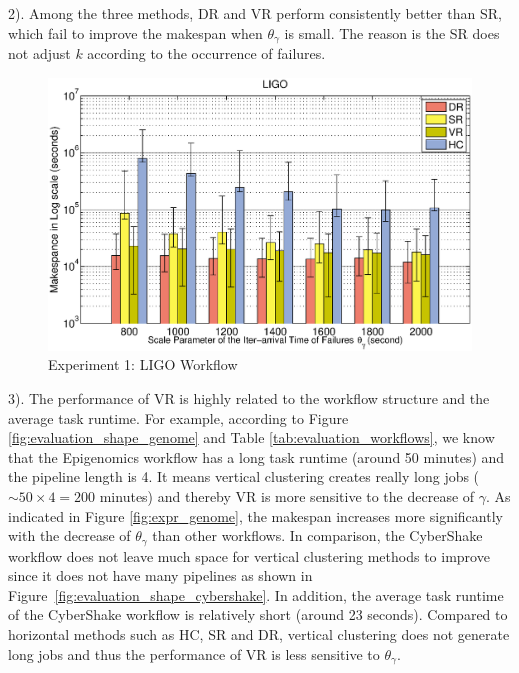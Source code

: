 2). Among the three methods, DR and VR perform consistently better than SR, which fail to improve the makespan when $\theta_{\gamma}$ is small. The reason is the SR does not adjust $k$ according to the occurrence of failures. 

\begin{figure}[!htb]
\centering
  \includegraphics[width=1\linewidth]{figures/tolerance/ligo.eps}
  \caption{Experiment 1: LIGO Workflow}
  \label{fig:expr_ligo}
\end{figure}

3). The performance of VR is highly related to the workflow structure and the average task runtime. For example, according to Figure \ref{fig:evaluation_shape_genome} and Table \ref{tab:evaluation_workflows}, we know that the Epigenomics workflow has a long task runtime (around 50 minutes) and the pipeline length is 4. It means vertical clustering creates really long jobs ($\sim 50\times 4=200$ minutes) and thereby VR is more sensitive to the decrease of $\gamma$. As indicated in Figure \ref{fig:expr_genome}, the makespan increases more significantly with the decrease of $\theta_{\gamma}$ than other workflows. In comparison, the CyberShake workflow does not leave much space for vertical clustering methods to improve since it does not have many pipelines as shown in Figure~\ref{fig:evaluation_shape_cybershake}. In addition, the average task runtime of the CyberShake workflow is relatively short (around 23 seconds). Compared to horizontal methods such as HC, SR and DR, vertical clustering does not generate long jobs and thus the performance of VR is less  sensitive to $\theta_{\gamma}$. 

